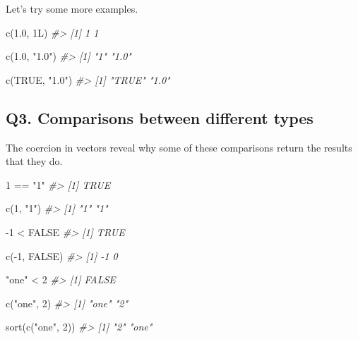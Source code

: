 \documentclass[
]{book}
\newenvironment{Shaded}{\begin{snugshade}}{\end{snugshade}}
\newcommand{\CommentTok}[1]{\textcolor[rgb]{0.56,0.35,0.01}{\textit{#1}}}
\newcommand{\ConstantTok}[1]{\textcolor[rgb]{0.00,0.00,0.00}{#1}}
\newcommand{\DecValTok}[1]{\textcolor[rgb]{0.00,0.00,0.81}{#1}}
\newcommand{\FloatTok}[1]{\textcolor[rgb]{0.00,0.00,0.81}{#1}}
\newcommand{\FunctionTok}[1]{\textcolor[rgb]{0.00,0.00,0.00}{#1}}
\newcommand{\NormalTok}[1]{#1}
\newcommand{\SpecialCharTok}[1]{\textcolor[rgb]{0.00,0.00,0.00}{#1}}
\newcommand{\StringTok}[1]{\textcolor[rgb]{0.31,0.60,0.02}{#1}}
\begin{document}
Let's try some more examples.

\begin{Shaded}
\begin{Highlighting}[]
\FunctionTok{c}\NormalTok{(}\FloatTok{1.0}\NormalTok{, 1L)}
\CommentTok{\#\textgreater{} [1] 1 1}

\FunctionTok{c}\NormalTok{(}\FloatTok{1.0}\NormalTok{, }\StringTok{"1.0"}\NormalTok{)}
\CommentTok{\#\textgreater{} [1] "1"   "1.0"}

\FunctionTok{c}\NormalTok{(}\ConstantTok{TRUE}\NormalTok{, }\StringTok{"1.0"}\NormalTok{)}
\CommentTok{\#\textgreater{} [1] "TRUE" "1.0"}
\end{Highlighting}
\end{Shaded}

\hypertarget{q3.-comparisons-between-different-types}{%
\subsection*{Q3. Comparisons between different types}\label{q3.-comparisons-between-different-types}}

The coercion in vectors reveal why some of these comparisons return the results that they do.

\begin{Shaded}
\begin{Highlighting}[]
\DecValTok{1} \SpecialCharTok{==} \StringTok{"1"}
\CommentTok{\#\textgreater{} [1] TRUE}

\FunctionTok{c}\NormalTok{(}\DecValTok{1}\NormalTok{, }\StringTok{"1"}\NormalTok{)}
\CommentTok{\#\textgreater{} [1] "1" "1"}
\end{Highlighting}
\end{Shaded}

\begin{Shaded}
\begin{Highlighting}[]
\SpecialCharTok{{-}}\DecValTok{1} \SpecialCharTok{\textless{}} \ConstantTok{FALSE}
\CommentTok{\#\textgreater{} [1] TRUE}

\FunctionTok{c}\NormalTok{(}\SpecialCharTok{{-}}\DecValTok{1}\NormalTok{, }\ConstantTok{FALSE}\NormalTok{)}
\CommentTok{\#\textgreater{} [1] {-}1  0}
\end{Highlighting}
\end{Shaded}

\begin{Shaded}
\begin{Highlighting}[]
\StringTok{"one"} \SpecialCharTok{\textless{}} \DecValTok{2}
\CommentTok{\#\textgreater{} [1] FALSE}

\FunctionTok{c}\NormalTok{(}\StringTok{"one"}\NormalTok{, }\DecValTok{2}\NormalTok{)}
\CommentTok{\#\textgreater{} [1] "one" "2"}

\FunctionTok{sort}\NormalTok{(}\FunctionTok{c}\NormalTok{(}\StringTok{"one"}\NormalTok{, }\DecValTok{2}\NormalTok{))}
\CommentTok{\#\textgreater{} [1] "2"   "one"}
\end{Highlighting}
\end{Shaded}
\end{document}
